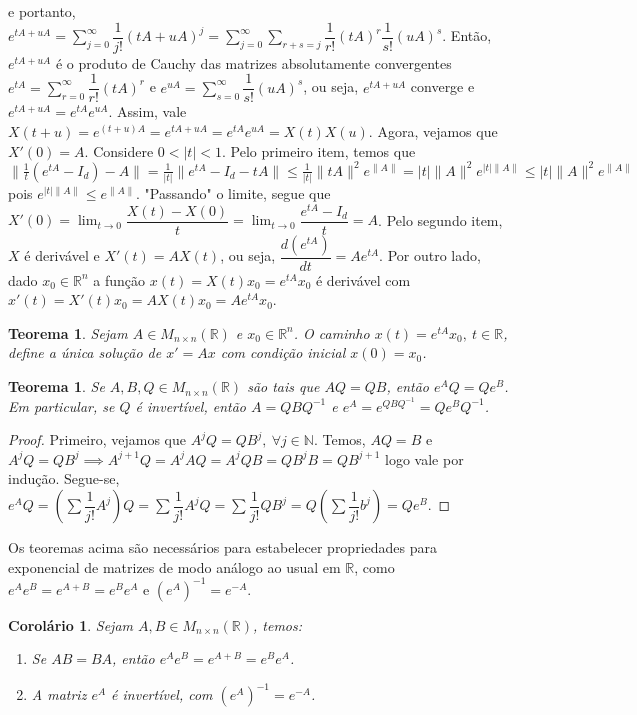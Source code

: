 \documentclass[a4paper, 12pt]{article}
\renewcommand{\Bbb}{\mathbb}
\newtheorem*{10}{Teorema}
\newtheorem*{11}{Teorema}
\newtheorem*{12}{Corolário}
\begin{document}
e portanto, $e^{tA+uA}=\sum^{\infty}_{j=0}\dfrac{1}{j!}(tA+uA)^j=\sum^{\infty}_{j=0}\sum_{r+s=j}\dfrac{1}{r!}(tA)^r\dfrac{1}{s!}(uA)^s$. Então, $e^{tA+uA}$ é o produto de Cauchy das matrizes absolutamente convergentes $e^{tA}=\sum^{\infty}_{r=0}\dfrac{1}{r!}(tA)^r$ e $e^{uA}=\sum^{\infty}_{s=0}\dfrac{1}{s!}(uA)^s$, ou seja, $e^{tA+uA}$ converge e $e^{tA+uA}=e^{tA}e^{uA}$. Assim, vale $X(t+u)=e^{(t+u)A}=e^{tA+uA}=e^{tA}e^{uA}=X(t)X(u)$. Agora, vejamos que $X'(0)=A$. Considere $0<|t|<1$. Pelo primeiro item, temos que $\lVert \frac{1}{t}(e^{tA}-I_d)-A\rVert=\frac{1}{|t|}\lVert e^{tA}-I_d-tA\rVert\leq\frac{1}{|t|}\lVert tA\rVert^2e^{\lVert A\rVert}=|t|\lVert A\rVert^2e^{|t|\lVert A\rVert}\leq|t|\lVert A\rVert^2e^{\lVert A\rVert}$ pois $e^{|t|\lVert A\rVert}\leq e^{\lVert A\rVert}$. "Passando" o limite, segue que $X'(0)=\lim_{t\to0}\dfrac{X(t)-X(0)}{t}=\lim_{t\to0}\dfrac{e^{tA}-I_d}{t}=A$. Pelo segundo item, $X$ é derivável e $X'(t)=AX(t)$, ou seja, $\dfrac{d(e^{tA})}{dt}=Ae^{tA}$. Por outro lado, dado $x_0 \in \Bbb R^n$ a função $x(t)=X(t)x_0=e^{tA}x_0$ é derivável com $x'(t)=X'(t)x_0=AX(t)x_0=Ae^{tA}x_0$.
\begin{10}
Sejam $A\in M_{n\times n}(\Bbb R)$ e $x_0\in \Bbb R^n$. O caminho $x(t)=e^{tA}x_0,\ t\in \Bbb R$, define a única solução de $x'=Ax$ com condição inicial $x(0)=x_0$.
\end{10}
\begin{11}
Se $A,B,Q\in M_{n\times n}(\Bbb R)$ são tais que $AQ=QB$, então $e^AQ=Qe^B$. Em particular, se $Q$ é invertível, então $A=QBQ^{-1}$ e $e^A=e^{QBQ^{-1}}=Qe^BQ^{-1}$.
\end{11}
\begin{proof}
Primeiro, vejamos que $A^jQ=QB^j,\ \forall j\in \Bbb N$. Temos, $AQ=B$ e $A^jQ=QB^j \implies A^{j+1}Q=A^jAQ=A^jQB=QB^jB=QB^{j+1}$ logo vale por indução. Segue-se, $e^AQ=(\sum\dfrac{1}{j!}A^j)Q=\sum\dfrac{1}{j!}A^jQ=\sum\dfrac{1}{j!}QB^j=Q(\sum\dfrac{1}{j!}b^j)=Qe^B$.
\end{proof}
Os teoremas acima são necessários para estabelecer propriedades para exponencial de matrizes de modo análogo ao usual em $\Bbb R$, como $e^Ae^B=e^{A+B}=e^Be^A$ e $(e^A)^{-1}=e^{-A}$.
\begin{12}
Sejam $A,B\in M_{n\times n}(\Bbb R)$, temos:
\begin{enumerate}
    \item Se $AB=BA$, então $e^Ae^B=e^{A+B}=e^Be^A$.
    \item A matriz $e^A$ é invertível, com $(e^A)^{-1}=e^{-A}$.
\end{enumerate}
\end{12}
\end{document}
